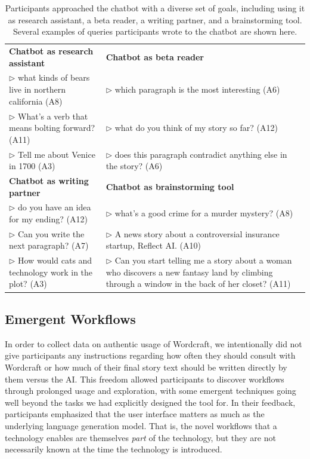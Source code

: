 \begin{table}[t]
  \centering
  \small
  \caption{Participants approached the chatbot with a diverse set of goals, including using it as research assistant, a beta reader, a writing partner, and a brainstorming tool. Several examples of queries participants wrote to the chatbot are shown here.}
  \label{table:chatbot_uses}
    \begin{tabular}{p{2.6in}|p{3.2in}}
    \hline
    \textbf{Chatbot as research assistant} & \textbf{Chatbot as beta reader} \\
    $\rhd$ what kinds of bears live in northern california (A8) & $\rhd$ which paragraph is the most interesting (A6) \\
    $\rhd$ What's a verb that means bolting forward? (A11) & $\rhd$ what do you think of my story so far? (A12) \\
    $\rhd$ Tell me about Venice in 1700 (A3) &  $\rhd$ does this paragraph contradict anything else in the story? (A6) \\
    \hline
    \textbf{Chatbot as writing partner} & \textbf{Chatbot as brainstorming tool} \\
    $\rhd$ do you have an idea for my ending? (A12) & $\rhd$ what's a good crime for a murder mystery? (A8) \\
    $\rhd$ Can you write the next paragraph? (A7) & $\rhd$ A news story about a controversial insurance startup, Reflect AI. (A10) \\
    $\rhd$ How would cats and technology work in the plot? (A3) & $\rhd$ Can you start telling me a story about a woman who discovers a new fantasy land by climbing through a window in the back of her closet? (A11) \\
    \hline
    \end{tabular}%
\end{table}%

\subsection{Emergent Workflows}
In order to collect data on authentic usage of Wordcraft, we intentionally did not give participants any instructions regarding how often they should consult with Wordcraft or how much of their final story text should be written directly by them versus the AI.
This freedom allowed participants to discover workflows through prolonged usage and exploration, with some emergent techniques going well beyond the tasks we had explicitly designed the tool for.
In their feedback, participants emphasized that the user interface matters as much as the underlying language generation model.
That is, the novel workflows that a technology enables are themselves \textit{part} of the technology, but they are not necessarily known at the time the technology is introduced.

